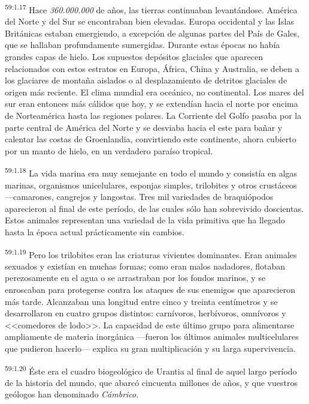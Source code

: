 \par
\textsuperscript{59:1.17} Hace \textit{360.000.000} de años, las tierras continuaban levantándose. América del Norte y del Sur se encontraban bien elevadas. Europa occidental y las Islas Británicas estaban emergiendo, a excepción de algunas partes del País de Gales, que se hallaban profundamente sumergidas. Durante estas épocas no había grandes capas de hielo. Los supuestos depósitos glaciales que aparecen relacionados con estos estratos en Europa, África, China y Australia, se deben a los glaciares de montaña aislados o al desplazamiento de detritos glaciales de origen más reciente. El clima mundial era oceánico, no continental. Los mares del sur eran entonces más cálidos que hoy, y se extendían hacia el norte por encima de Norteamérica hasta las regiones polares. La Corriente del Golfo pasaba por la parte central de América del Norte y se desviaba hacia el este para bañar y calentar las costas de Groenlandia, convirtiendo este continente, ahora cubierto por un manto de hielo, en un verdadero paraíso tropical.

\par
\textsuperscript{59:1.18} La vida marina era muy semejante en todo el mundo y consistía en algas marinas, organismos unicelulares, esponjas simples, trilobites y otros crustáceos ---camarones, cangrejos y langostas. Tres mil variedades de braquiópodos aparecieron al final de este período, de las cuales sólo han sobrevivido doscientas. Estos animales representan una variedad de la vida primitiva que ha llegado hasta la época actual prácticamente sin cambios.

\par
\textsuperscript{59:1.19} Pero los trilobites eran las criaturas vivientes dominantes. Eran animales sexuados y existían en muchas formas; como eran malos nadadores, flotaban perezosamente en el agua o se arrastraban por los fondos marinos, y se enroscaban para protegerse contra los ataques de sus enemigos que aparecieron más tarde. Alcanzaban una longitud entre cinco y treinta centímetros y se desarrollaron en cuatro grupos distintos: carnívoros, herbívoros, omnívoros y <<comedores de lodo>>. La capacidad de este último grupo para alimentarse ampliamente de materia inorgánica ---fueron los últimos animales multicelulares que pudieron hacerlo--- explica su gran multiplicación y su larga supervivencia.

\par
\textsuperscript{59:1.20} Éste era el cuadro biogeológico de Urantia al final de aquel largo período de la historia del mundo, que abarcó cincuenta millones de años, y que vuestros geólogos han denominado \textit{Cámbrico}.

